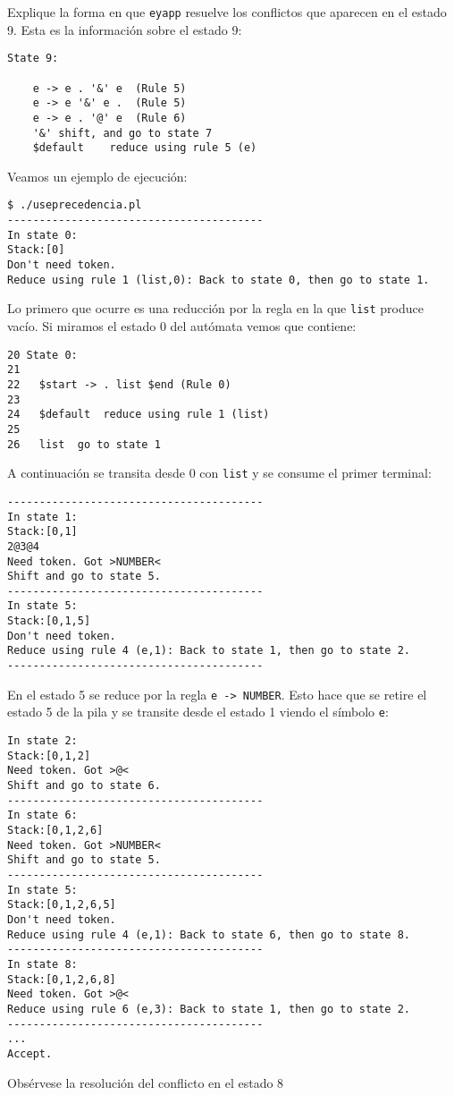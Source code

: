 \begin{exercise}
Explique la forma en que \verb|eyapp| resuelve 
los conflictos que aparecen en el estado 9.
Esta es la información sobre el estado 9:

\begin{verbatim}
State 9:

	e -> e . '&' e	(Rule 5)
	e -> e '&' e .	(Rule 5)
	e -> e . '@' e	(Rule 6)
	'&'	shift, and go to state 7
	$default	reduce using rule 5 (e)
\end{verbatim}
\end{exercise}

Veamos un ejemplo de ejecución:

\begin{verbatim}
$ ./useprecedencia.pl
----------------------------------------
In state 0:
Stack:[0]
Don't need token.
Reduce using rule 1 (list,0): Back to state 0, then go to state 1.
\end{verbatim}
Lo primero que ocurre es una reducción por la regla 
en la que \verb|list| produce vacío. Si miramos el estado 0
del autómata vemos que contiene:
\begin{verbatim}
20 State 0:
21
22   $start -> . list $end (Rule 0)
23
24   $default  reduce using rule 1 (list)
25
26   list  go to state 1
\end{verbatim}
A continuación se transita desde 0 con \verb|list|
y se consume el primer terminal:
\begin{verbatim}
----------------------------------------
In state 1:
Stack:[0,1]
2@3@4
Need token. Got >NUMBER<
Shift and go to state 5.
----------------------------------------
In state 5:
Stack:[0,1,5]
Don't need token.
Reduce using rule 4 (e,1): Back to state 1, then go to state 2.
----------------------------------------
\end{verbatim}
En el estado 5 se reduce por la regla \verb|e -> NUMBER|.
Esto hace que se retire el estado 5 de la pila y se
transite desde el estado 1 viendo el símbolo \verb|e|:
\begin{verbatim}
In state 2:
Stack:[0,1,2]
Need token. Got >@<
Shift and go to state 6.
----------------------------------------
In state 6:
Stack:[0,1,2,6]
Need token. Got >NUMBER<
Shift and go to state 5.
----------------------------------------
In state 5:
Stack:[0,1,2,6,5]
Don't need token.
Reduce using rule 4 (e,1): Back to state 6, then go to state 8.
----------------------------------------
In state 8:
Stack:[0,1,2,6,8]
Need token. Got >@<
Reduce using rule 6 (e,3): Back to state 1, then go to state 2.
----------------------------------------
...
Accept.
\end{verbatim}
Obsérvese la resolución del conflicto en el estado 8

